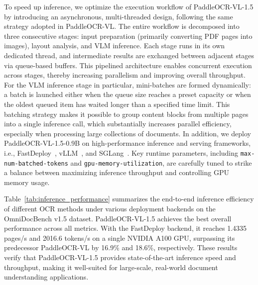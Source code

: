 \documentclass[11pt, a4paper,logo,  copyright, nonumbering]{paddleocr}
\begin{document}
To speed up inference, we optimize the execution workflow of PaddleOCR-VL-1.5 by introducing an asynchronous, multi-threaded design, following the same strategy adopted in PaddleOCR-VL. The entire workflow is decomposed into three consecutive stages: input preparation (primarily converting PDF pages into images), layout analysis, and VLM inference. Each stage runs in its own dedicated thread, and intermediate results are exchanged between adjacent stages via queue-based buffers. This pipelined architecture enables concurrent execution across stages, thereby increasing parallelism and improving overall throughput. For the VLM inference stage in particular, mini-batches are formed dynamically: a batch is launched either when the queue size reaches a preset capacity or when the oldest queued item has waited longer than a specified time limit. This batching strategy makes it possible to group content blocks from multiple pages into a single inference call, which substantially increases parallel efficiency, especially when processing large collections of documents. In addition, we deploy PaddleOCR-VL-1.5-0.9B on high-performance inference and serving frameworks, i.e., FastDeploy~\cite{PaddlePaddle_FastDeploy}, vLLM~\cite{kwon2023efficient}, and SGLang~\cite{zheng2024sglang}. Key runtime parameters, including \texttt{max-num-batched-tokens} and \texttt{gpu-memory-utilization}, are carefully tuned to strike a balance between maximizing inference throughput and controlling GPU memory usage.



Table~\ref{tab:inference_performance} summarizes the end-to-end inference efficiency of different OCR methods under various deployment backends on the OmniDocBench v1.5 dataset. PaddleOCR-VL-1.5 achieves the best overall performance across all metrics. With the FastDeploy
 backend, it reaches 1.4335 pages/s and 2016.6 tokens/s on a single NVIDIA A100 GPU, surpassing its predecessor PaddleOCR-VL by 16.9\% and 18.6\%, respectively. These results verify that PaddleOCR-VL-1.5 provides state-of-the-art inference speed and throughput, making it well-suited for large-scale, real-world document understanding applications.
\end{document}
